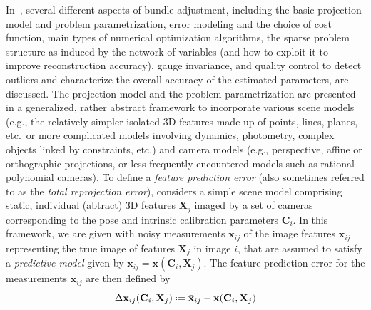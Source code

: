 \documentclass[10pt]{article}
\newcommand*{\defeq}{\mathrel{\vcenter{\baselineskip0.5ex \lineskiplimit0pt
                     \hbox{\scriptsize.}\hbox{\scriptsize.}}}
                     =}
\begin{document}
In~\cite{BundleAdjustment}, several different aspects of bundle adjustment, including the basic projection model and problem parametrization, error modeling and the choice of cost function, main types of numerical optimization algorithms, the sparse problem structure as induced by the network of variables (and how to exploit it to improve reconstruction accuracy), gauge invariance, and quality control to detect outliers and characterize the overall accuracy of the estimated parameters, are discussed. The projection model and the problem parametrization are presented in a generalized, rather abstract framework to incorporate various scene models (e.g., the relatively simpler isolated $3$D features made up of points, lines, planes, etc.~or more complicated models involving dynamics, photometry, complex objects linked by constraints, etc.) and camera models (e.g., perspective, affine or orthographic projections, or less frequently encountered models such as rational polynomial cameras). To define a \textit{feature prediction error} (also sometimes referred to as the \textit{total reprojection error}), \cite{BundleAdjustment} considers a simple scene model comprising static, individual (abtract) $3$D features $\mathbf{X}_j$ imaged by a set of cameras corresponding to the pose and intrinsic calibration parameters $\mathbf{C}_i$. In this framework, we are given with noisy measurements $\bar{\mathbf{x}}_{ij}$ of the image features $\mathbf{x}_{ij}$ representing the true image of features $\mathbf{X}_j$ in image $i$, that are assumed to satisfy a \textit{predictive model} given by $\mathbf{x}_{ij} = \mathbf{x}(\mathbf{C}_i,\mathbf{X}_j)$. The feature prediction error for the measurements $\bar{\mathbf{x}}_{ij}$ are then defined by
\begin{equation}
\label{eq:BAerror}
\Delta\mathbf{x}_{ij}(\mathbf{C}_i,\mathbf{X}_j) \defeq \bar{\mathbf{x}}_{ij} - \mathbf{x}(\mathbf{C}_i,\mathbf{X}_j)
\end{equation}
\end{document}

